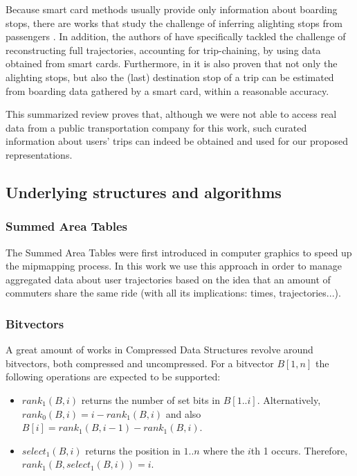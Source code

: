 \documentclass[runningheads]{llncs}
\begin{document}
Because smart card methods usually provide only information about boarding stops, there are works that study the challenge of inferring alighting stops from passengers \cite{wang2011review}. In addition, the authors of \cite{tao2014exploring} have specifically tackled the challenge of reconstructing full trajectories, accounting for trip-chaining, by using data obtained from smart cards. Furthermore, in \cite{alsger2016validating} it is also proven that not only the alighting stops, but also the (last) destination stop of a trip can be estimated from boarding data gathered by a smart card, within a reasonable accuracy.

This summarized review proves that, although we were not able to access real data from a public transportation company for this work, such curated information about users' trips can indeed be obtained and used for our proposed representations.

\subsection{Underlying structures and algorithms}
\subsubsection{Summed Area Tables}
The Summed Area Tables were first introduced in computer graphics \cite{crow1984summed} to speed up the mipmapping process. In this work we use this approach in order to manage aggregated data about user trajectories based on the idea that an amount of commuters share the same ride (with all its implications: times, trajectories...).

\subsubsection{Bitvectors}
\label{sec:bit}
A great amount of works in Compressed Data Structures revolve around bitvectors, both compressed and uncompressed. For a bitvector $B[1,n]$ the following operations are expected to be supported:

\begin{itemize}
    \item $rank_1(B,i)$ returns the number of set bits in $B[1..i]$. Alternatively, $rank_0(B,i) = i - rank_1(B,i)$ and also $B[i] = rank_1(B,i-1) - rank_1(B,i)$.
    \item $select_1(B,i)$ returns the position in $1..n$ where the $i$th 1 occurs. Therefore, $rank_1(B,select_1(B,i)) = i$.
\end{itemize}
\end{document}
